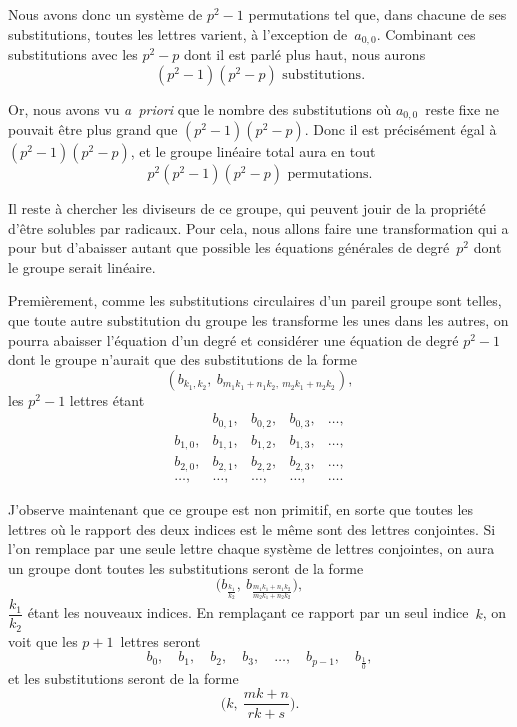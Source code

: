 \documentclass[leqno,12pt]{book}[2005/09/16]
\newcommand{\efrac}[2]{\tfrac{#1}{#2}}
\begin{document}
Nous avons donc un système de $p^{2} - 1$ permutations tel que,
dans chacune de ses substitutions, toutes les lettres varient, à
l'exception de~$a_{0,0}$. Combinant ces substitutions avec les $p^{2} - p$
dont il est parlé plus haut, nous aurons
\[
(p^{2} - 1)(p^{2} - p) \text{ substitutions}.
\]

Or, nous avons vu \textit{a~priori} que le nombre des substitutions
où $a_{0,0}$~reste fixe ne pouvait être plus grand que $(p^{2} - 1)(p^{2} - p)$.
Donc il est précisément égal à $(p^{2} - 1)(p^{2} - p)$, et le groupe
linéaire total aura en tout
\[
p^{2}(p^{2} - 1)(p^{2} - p) \text{ permutations}.
\]

Il reste à chercher les diviseurs de ce groupe, qui peuvent
jouir de la propriété d'être solubles par radicaux. Pour cela, nous
allons faire une transformation qui a pour but d'abaisser autant
que possible les équations générales de degré~$p^{2}$ dont le groupe
serait linéaire.

Premièrement, comme les substitutions circulaires d'un pareil
groupe sont telles, que toute autre substitution du groupe les
transforme les unes dans les autres, on pourra abaisser l'équation
d'un degré et considérer une équation de degré $p^{2} - 1$ dont le
groupe n'aurait que des substitutions de la forme
\[
(b_{k_{1}, k_{2}},\ b_{m_{1}k_{1}+n_{1}k_{2},\: m_{2}k_{1}+n_{2}k_{2}}),
\]
les $p^{2} - 1$ lettres étant
\[
\begin{array}{*{5}{l}}
         &b_{0,1}, &b_{0,2}, &b_{0,3}, &\dots,\\
b_{1,0}, &b_{1,1}, &b_{1,2}, &b_{1,3}, &\dots,\\
b_{2,0}, &b_{2,1}, &b_{2,2}, &b_{2,3}, &\dots,\\
\dots,  &\dots,  &\dots,  &\dots,  &\dots.
\end{array}
\]

J'observe maintenant que ce groupe est non primitif, en sorte
que toutes les lettres où le rapport des deux indices est le même
sont des lettres conjointes. Si l'on remplace par une seule lettre
chaque système de lettres conjointes, on aura un groupe dont
toutes les substitutions seront de la forme
\[
\biggl(b_{\efrac{k_{1}}{k_{2}}},\
      b_{\efrac{m_{1} k_{1} + n_{1} k_{2}}{m_{2} k_{1} + n_{2} k_{2}}}\biggr),
\]
$\dfrac{k_{1}}{k_{2}}$ étant les nouveaux indices. En remplaçant ce rapport par un
seul indice~$k$, on voit que les $p + 1$~lettres seront
\[
b_{0}, \quad b_{1}, \quad b_{2}, \quad b_{3}, \quad \dots, \quad b_{p-1}, \quad b_{\efrac{1}{0}},
\]
et les substitutions seront de la forme
\[
\biggl(k,\ \frac{mk + n}{rk + s}\biggr).
\]
\end{document}
